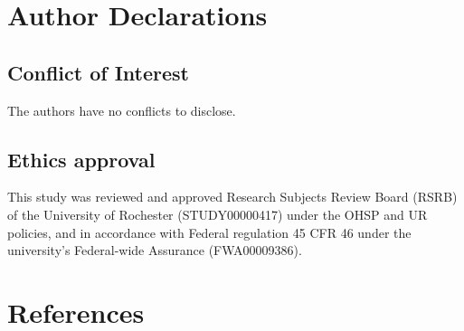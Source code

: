 \documentclass[preprint]{JASA}
\begin{document}
\section*{Author Declarations}\label{author-declarations}

\subsection*{Conflict of Interest}\label{conflict-of-interest}

The authors have no conflicts to disclose.

\subsection*{Ethics approval}\label{ethics-approval}

This study was reviewed and approved Research Subjects Review Board (RSRB) of the University of Rochester (STUDY00000417) under the OHSP and UR policies, and in accordance with Federal regulation 45 CFR 46 under the university's Federal-wide Assurance (FWA00009386).

\newpage{}

\section{References}\label{sec:references}

\begingroup
\setlength{\parindent}{-0.5in}
\setlength{\leftskip}{0.5in}

\nocite{balzano1982}
\nocite{barreda-nearey2018}
\nocite{goldinger1996}
\nocite{hay2017}
\nocite{hay2019}
\nocite{johnson1999}
\nocite{kleinschmidt-jaeger2016}
\nocite{mcgowan2015}
\nocite{shankweiler1978}
\nocite{shannon1948}
\nocite{strange-jenkins2012}
\nocite{sumner2011}
\nocite{walker-hay2011}
\nocite{zwicker1957}
\nocite{zwicker-terhardt1980}

\endgroup









\end{document}
